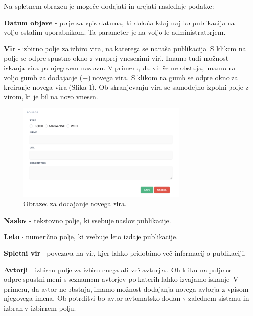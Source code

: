 \documentclass[a4paper, 12pt]{book}
\begin{document}
\clearpage
Na spletnem obrazcu je mogoče dodajati in urejati naslednje podatke:

\begin{description}
    \item \textbf{Datum objave} - polje za vpis datuma, ki določa kdaj naj bo publikacija na voljo ostalim uporabnikom. Ta parameter je na voljo le administratorjem.
    
    \item \textbf{Vir} - izbirno polje za izbiro vira, na katerega se nanaša publikacija. S klikom na polje se odpre spustno okno z vnaprej vnesenimi viri. Imamo tudi možnost iskanja vira po njegovem naslovu. V primeru, da vir še ne obstaja, imamo na voljo gumb za dodajanje (+) novega vira. S klikom na gumb se odpre okno za kreiranje novega vira (Slika \ref{add-source}). Ob shranjevanju vira se samodejno izpolni polje z virom, ki je bil na novo vnesen.
    
    \begin{figure}[h]
        \begin{center}
        \includegraphics[width=0.75\textwidth]{slike/add-source.png}
        \end{center}
        \caption{ Obrazec za dodajanje novega vira. }
        \label{add-source}
    \end{figure}
    
    \item \textbf{Naslov} - tekstovno polje, ki vsebuje naslov publikacije.
    
    \item \textbf{Leto} - numerično polje, ki vsebuje leto izdaje publikacije.
    
    \item \textbf{Spletni vir} - povezava na vir, kjer lahko pridobimo več informacij o publikaciji.
    
    \item \textbf{Avtorji} - izbirno polje za izbiro enega ali več avtorjev. Ob kliku na polje se odpre spustni meni s seznamom avtorjev po katerih lahko izvajamo iskanje. V primeru, da avtor ne obstaja, imamo možnost dodajanja novega avtorja z vpisom njegovega imena. Ob potrditvi bo avtor avtomatsko dodan v zalednem sistemu in izbran v izbirnem polju.
    

\end{description}
\end{document}
